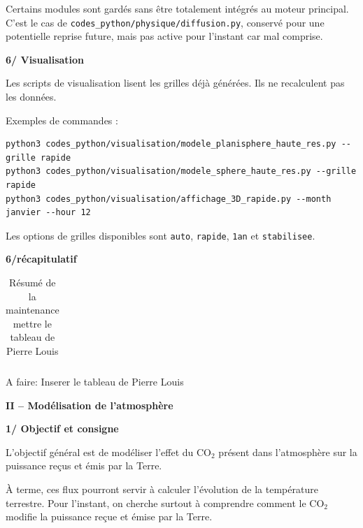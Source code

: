\documentclass[11pt,a4paper]{article}
\newcommand{\code}[1]{\texttt{#1}}
\newcommand{\COtwo}{CO$_2$}
\newcommand{\titreprincipal}[1]{%
    \begin{tcolorbox}[
        colback=white,
        colframe=DocRed,
        boxrule=1pt,
        arc=1mm,
        left=3mm,
        right=3mm,
        top=2mm,
        bottom=2mm
    ]
    {\LARGE\bfseries\textcolor{DocRed}{#1}}
    \end{tcolorbox}
}
\newcommand{\partietitre}[1]{%
    \vspace{1.1em}
    {\Large\bfseries\textcolor{DocRed}{#1}}\par
    \vspace{0.35em}
}
\begin{document}
Certains modules sont gardés sans être totalement intégrés au moteur principal. C'est le cas de \code{codes\_python/physique/diffusion.py}, conservé pour une potentielle reprise future, mais pas active pour l'instant car mal comprise.

\partietitre{6/ Visualisation}

Les scripts de visualisation lisent les grilles déjà générées. Ils ne recalculent pas les données.

Exemples de commandes :

\begin{verbatim}
python3 codes_python/visualisation/modele_planisphere_haute_res.py --grille rapide
python3 codes_python/visualisation/modele_sphere_haute_res.py --grille rapide
python3 codes_python/visualisation/affichage_3D_rapide.py --month janvier --hour 12
\end{verbatim}

Les options de grilles disponibles sont \code{auto}, \code{rapide}, \code{1an} et \code{stabilisee}.

\partietitre{6/récapitulatif}

\renewcommand{\arraystretch}{1.25}
\begin{table}[H]
\centering
\begin{tabularx}{\textwidth}{>{\bfseries}p{3.6cm} X}

\end{tabularx}
\caption{Résumé de la maintenance mettre le tableau de Pierre Louis}
\end{table}
\renewcommand{\arraystretch}{1}

\textcolor{green!50!black}{A faire: Inserer le tableau de Pierre Louis}

\newpage

\titreprincipal{II -- Modélisation de l'atmosphère}

\partietitre{1/ Objectif et consigne}

L'objectif général est de modéliser l'effet du \COtwo{} présent dans l'atmosphère sur la puissance reçus et émis par la Terre.

À terme, ces flux pourront servir à calculer l'évolution de la température terrestre. Pour l'instant, on cherche surtout à comprendre comment le \COtwo{} modifie la puissance reçue et émise par la Terre.
\end{document}

